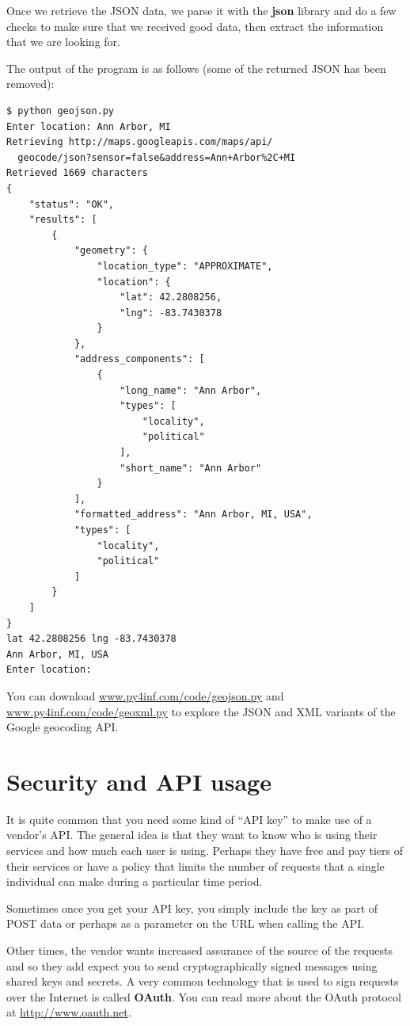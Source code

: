 Once we retrieve the JSON data, we parse it with the {\bf json}
library and do a few checks to make sure that we received good data, 
then extract the information that we are looking for.

The output of the program is as follows (some of the returned
JSON has been removed):

\beforeverb
\begin{verbatim}
$ python geojson.py
Enter location: Ann Arbor, MI
Retrieving http://maps.googleapis.com/maps/api/
  geocode/json?sensor=false&address=Ann+Arbor%2C+MI
Retrieved 1669 characters
{
    "status": "OK", 
    "results": [
        {
            "geometry": {
                "location_type": "APPROXIMATE", 
                "location": {
                    "lat": 42.2808256, 
                    "lng": -83.7430378
                }
            }, 
            "address_components": [
                {
                    "long_name": "Ann Arbor", 
                    "types": [
                        "locality", 
                        "political"
                    ], 
                    "short_name": "Ann Arbor"
                } 
            ], 
            "formatted_address": "Ann Arbor, MI, USA", 
            "types": [
                "locality", 
                "political"
            ]
        }
    ]
}
lat 42.2808256 lng -83.7430378
Ann Arbor, MI, USA
Enter location:
\end{verbatim}
\afterverb
%
You can download 
\url{www.py4inf.com/code/geojson.py} and 
\url{www.py4inf.com/code/geoxml.py} to explore the JSON
and XML variants of the Google geocoding API. 

\section{Security and API usage}

It is quite common that you need some kind of 
``API key'' to make use of a vendor's API.  The
general idea is that they want to know who is using 
their services and how much each user is using.  
Perhaps they have free and pay tiers of their services
or have a policy that limits the number of requests 
that a single individual can make during a particular 
time period.

Sometimes once you get your API key, you simply include
the key as part of POST data or perhaps as a parameter
on the URL when calling the API.

Other times, the vendor wants increased assurance of
the source of the requests and so they add expect you 
to send cryptographically signed messages using shared
keys and secrets.   A very common technology that is used 
to sign requests over the Internet is called {\bf OAuth}.
You can read more about the OAuth protocol at
\url{http://www.oauth.net}.

